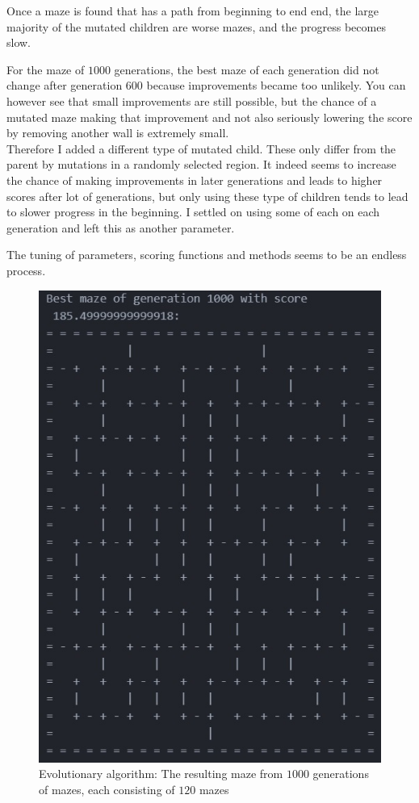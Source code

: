 \documentclass[10pt, a4paper, twoside]{amsart}
\newcommand{\1}{\mathbbm{1}}
\begin{document}
Once a maze is found that has a path from beginning to end end, the large majority of the mutated children are worse mazes, and the progress becomes slow.

For the maze of $1000$ generations, the best maze of each generation did not change after generation $600$ because improvements became too unlikely. You can however see that small improvements are still possible, but the chance of a mutated maze making that improvement and not also seriously lowering the score by removing another wall is extremely small.\\

Therefore I added a different type of mutated child. These only differ from the parent by mutations in a randomly selected region. It indeed seems to increase the chance of making improvements in later generations and leads to higher scores after lot of generations, but only using these type of children tends to lead to slower progress in the beginning. I settled on using some of each on each generation and left this as another parameter.

The tuning of parameters, scoring functions and methods seems to be an endless process.

\begin{figure}
\centering
        \includegraphics[totalheight=8cm]{evolutional.jpg}
    \caption{Evolutionary algorithm: The resulting maze from $1000$ generations of mazes, each consisting of $120$ mazes}
\end{figure}
\end{document}
